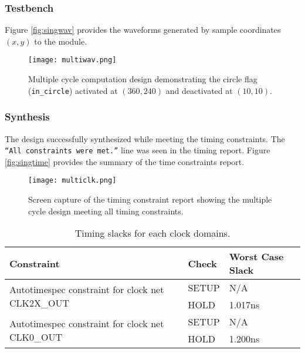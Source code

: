 \documentclass[paper=usletter, fontsize=12pt]{article}
\begin{document}
        \subsubsection{Testbench} Figure \ref{fig:singwav} provides the
        waveforms generated by sample coordinates $(x, y)$ to the module.
        \begin{figure}[ht]
            \begin{center}
                \texttt{[image: multiwav.png]}
                \caption{Multiple cycle computation design demonstrating the
                circle flag (\texttt{in\_circle}) activated at $(360, 240)$ and
                deactivated at $(10,10)$.}
                \label{fig:multiwav}
            \end{center}
        \end{figure}

        \subsubsection{Synthesis} The design successfully synthesized while
        meeting the timing constraints. The \texttt{``All constraints were
        met.''} line was seen in the timing report. Figure \ref{fig:singtime}
        provides the summary of the time constraints report.

        \begin{figure}[ht]
            \begin{center}
                \texttt{[image: multiclk.png]}
                \caption{Screen capture of the timing constraint report showing
                the multiple cycle design meeting all timing constraints.}
                \label{fig:multiclk}
            \end{center}
        \end{figure}

        \begin{table}[h]
            \caption{Timing slacks for each clock domains.}
            \label{table:singslacks}
            \centering
            \begin{tabular}{ lm{5em}m{10em} }
\hline
\textbf{Constraint} & \textbf{Check}  &   \textbf{Worst Case Slack} \\
\hline
\multirow{ 2}{*}{Autotimespec constraint for clock net CLK2X\_OUT} & SETUP &
N/A \\
 & HOLD & 1.017ns \\
\multirow{ 2}{*}{Autotimespec constraint for clock net CLK0\_OUT} & SETUP &
N/A \\
 & HOLD & 1.200ns \\

\hline
            \end{tabular}
        \end{table}
\end{document}
